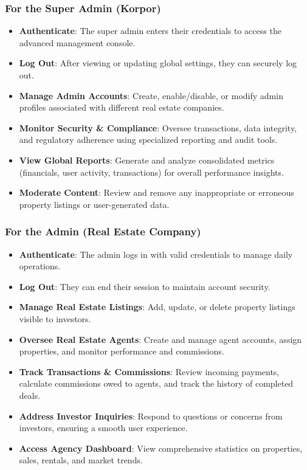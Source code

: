 \subsubsection{For the Super Admin (Korpor)}
\begin{itemize}
    \item \textbf{Authenticate}: The super admin enters their credentials to access the advanced management console.
    \item \textbf{Log Out}: After viewing or updating global settings, they can securely log out.
    \item \textbf{Manage Admin Accounts}: Create, enable/disable, or modify admin profiles associated with different real estate companies.
    \item \textbf{Monitor Security \& Compliance}: Oversee transactions, data integrity, and regulatory adherence using specialized reporting and audit tools.
    \item \textbf{View Global Reports}: Generate and analyze consolidated metrics (financials, user activity, transactions) for overall performance insights.
    \item \textbf{Moderate Content}: Review and remove any inappropriate or erroneous property listings or user-generated data.
\end{itemize} 

\subsubsection{For the Admin (Real Estate Company)}
\begin{itemize}
    \item \textbf{Authenticate}: The admin logs in with valid credentials to manage daily operations.
    \item \textbf{Log Out}: They can end their session to maintain account security.
    \item \textbf{Manage Real Estate Listings}: Add, update, or delete property listings visible to investors.
    \item \textbf{Oversee Real Estate Agents}: Create and manage agent accounts, assign properties, and monitor performance and commissions.
    \item \textbf{Track Transactions \& Commissions}: Review incoming payments, calculate commissions owed to agents, and track the history of completed deals.
    \item \textbf{Address Investor Inquiries}: Respond to questions or concerns from investors, ensuring a smooth user experience.
    \item \textbf{Access Agency Dashboard}: View comprehensive statistics on properties, sales, rentals, and market trends.
\end{itemize}

